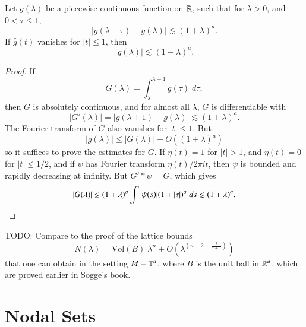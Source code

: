 \begin{lemma}
    Let $g(\lambda)$ be a piecewise continuous function on $\operatorname{\mathbb{R}}$, such that for $\lambda > 0$, and $0 < \tau \leq 1$,
    \[ |g(\lambda + \tau) - g(\lambda)| \lesssim (1 + \lambda)^a. \]
    If $\widehat{g}(t)$ vanishes for $|t| \leq 1$, then
    \[ |g(\lambda)| \lesssim (1 + \lambda)^a. \]
\end{lemma}
\begin{proof}
    If
    \[ G(\lambda) = \int_\lambda^{\lambda + 1} g(\tau)\; d\tau, \]
    then $G$ is absolutely continuous, and for almost all $\lambda$, $G$ is differentiable with
    \[ |G'(\lambda)| = |g(\lambda + 1) - g(\lambda)| \lesssim (1 + \lambda)^a. \]
    The Fourier transform of $G$ also vanishes for $|t| \leq 1$. But
    \[ |g(\lambda)| \leq |G(\lambda)| + O((1 + \lambda)^a) \]
    so it suffices to prove the estimates for $G$. If $\eta(t) = 1$ for $|t| > 1$, and $\eta(t) = 0$ for $|t| \leq 1/2$, and if $\psi$ has Fourier transform $\eta(t) / 2 \pi i t$, then $\psi$ is bounded and rapidly decreasing at infinity. But $G' * \psi = G$, which gives
    \[ |G(\lambda)| \lesssim (1 + \lambda)^a \int |\psi(s)| (1 + |s|)^a\; ds \lesssim (1 + \lambda)^a. \qedhere \]
\end{proof}

\begin{mdframed}
TODO: Compare to the proof of the lattice bounds
%
\[ N(\lambda) = \text{Vol}(B) \; \lambda^n + O \left( \lambda^{ \left( n-2 + \frac{2}{n+1} \right)} \right) \]
%
that one can obtain in the setting $M = \operatorname{\mathbb{T}}^d$, where $B$ is the unit ball in $\operatorname{\mathbb{R}}^d$, which are proved earlier in Sogge's book.
\end{mdframed}






\chapter{Nodal Sets}

